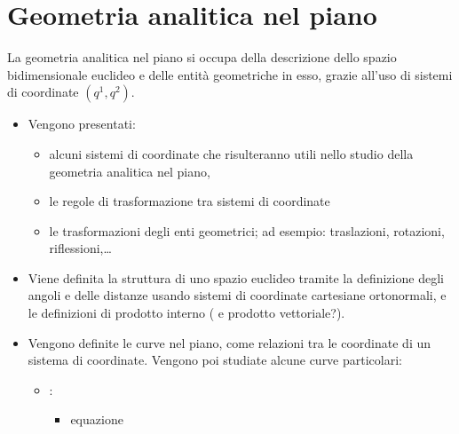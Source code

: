 \documentclass[letterpaper,10pt,italian]{jupyterBook}
\begin{document}
\chapter{Geometria analitica nel piano}
\label{\detokenize{ch/analytic_geometry/analytic_geometry_2d:geometria-analitica-nel-piano}}\label{\detokenize{ch/analytic_geometry/analytic_geometry_2d:geometry-analytic-2d}}\label{\detokenize{ch/analytic_geometry/analytic_geometry_2d::doc}}
\sphinxAtStartPar
La geometria analitica nel piano si occupa della descrizione dello spazio bidimensionale euclideo e delle entità geometriche in esso, grazie all’uso di sistemi di coordinate \((q^1, q^2)\).
\begin{itemize}
\item {} 
\sphinxAtStartPar
{} Vengono presentati:
\begin{itemize}
\item {} 
\sphinxAtStartPar
alcuni sistemi di coordinate che risulteranno utili nello studio della geometria analitica nel piano,

\item {} 
\sphinxAtStartPar
le regole di trasformazione tra sistemi di coordinate

\item {} 
\sphinxAtStartPar
le trasformazioni degli enti geometrici; ad esempio: traslazioni, rotazioni, riflessioni,…

\end{itemize}

\item {} 
\sphinxAtStartPar
{} Viene definita la struttura di uno spazio euclideo tramite la definizione degli angoli e delle distanze usando sistemi di coordinate cartesiane ortonormali, e le definizioni di prodotto interno ( e prodotto vettoriale?).

\item {} 
\sphinxAtStartPar
{} Vengono definite le curve nel piano, come relazioni tra le coordinate di un sistema di coordinate.   Vengono poi studiate alcune curve particolari:
\begin{itemize}
\item {} 
\sphinxAtStartPar
{}:
\begin{itemize}
\item {} 
\sphinxAtStartPar
equazione


\end{itemize}
\end{itemize}
\end{itemize}
\end{document}
